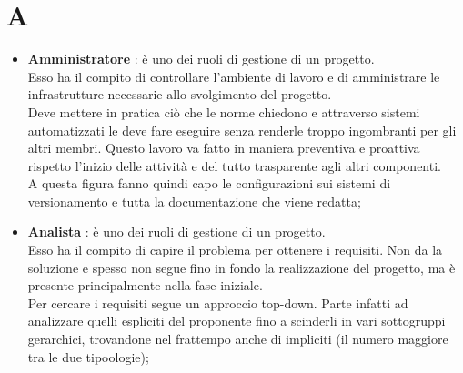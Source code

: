 % 
%
% 
%

\section{A}

\begin{itemize}
	\item \textbf{Amministratore} : è uno dei ruoli di gestione di un progetto. \\
Esso ha il compito di controllare l'ambiente di lavoro e di amministrare le infrastrutture necessarie allo svolgimento del progetto. \\
Deve mettere in pratica ciò che le norme chiedono e attraverso sistemi automatizzati le deve fare eseguire senza renderle troppo ingombranti per gli altri membri. Questo lavoro va fatto in maniera preventiva e proattiva rispetto l'inizio delle attività e del tutto trasparente agli altri componenti. \\
A questa figura fanno quindi capo le configurazioni sui sistemi di versionamento e tutta la documentazione che viene redatta;

	\item \textbf{Analista} : è uno dei ruoli di gestione di un progetto. \\
Esso ha il compito di capire il problema per ottenere i requisiti. Non da la soluzione e spesso non segue fino in fondo la realizzazione del progetto, ma è presente principalmente nella fase iniziale. \\
Per cercare i requisiti segue un approccio top-down. Parte infatti ad analizzare quelli espliciti del proponente fino a scinderli in vari sottogruppi gerarchici, trovandone nel frattempo anche di impliciti (il numero maggiore tra le due tipoologie);


\end{itemize}
